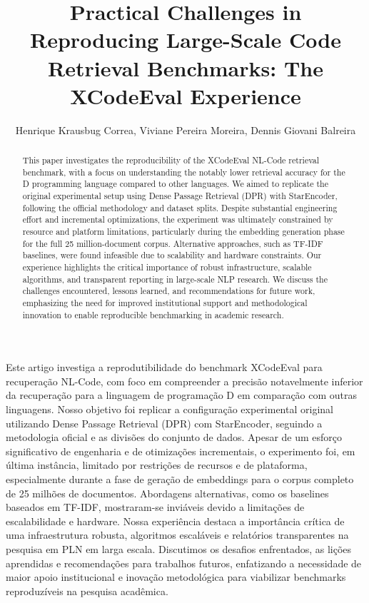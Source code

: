 \documentclass[12pt]{article}
\title{Practical Challenges in Reproducing Large-Scale Code Retrieval Benchmarks: The XCodeEval Experience}
\author{Henrique Krausbug Correa\inst{1}, Viviane Pereira Moreira\inst{1}, Dennis Giovani Balreira\inst{1}}
\begin{document}
 

\maketitle


\begin{abstract}
  This paper investigates the reproducibility of the XCodeEval NL-Code retrieval benchmark, with a focus on understanding the notably lower retrieval accuracy for the D programming language compared to other languages. We aimed to replicate the original experimental setup using Dense Passage Retrieval (DPR) with StarEncoder, following the official methodology and dataset splits. Despite substantial engineering effort and incremental optimizations, the experiment was ultimately constrained by resource and platform limitations, particularly during the embedding generation phase for the full 25 million-document corpus. Alternative approaches, such as TF-IDF baselines, were found infeasible due to scalability and hardware constraints. Our experience highlights the critical importance of robust infrastructure, scalable algorithms, and transparent reporting in large-scale NLP research. We discuss the challenges encountered, lessons learned, and recommendations for future work, emphasizing the need for improved institutional support and methodological innovation to enable reproducible benchmarking in academic research.
\end{abstract}
     
\begin{resumo} 
  Este artigo investiga a reprodutibilidade do benchmark XCodeEval para recuperação NL-Code, com foco em compreender a precisão notavelmente inferior da recuperação para a linguagem de programação D em comparação com outras linguagens. Nosso objetivo foi replicar a configuração experimental original utilizando Dense Passage Retrieval (DPR) com StarEncoder, seguindo a metodologia oficial e as divisões do conjunto de dados. Apesar de um esforço significativo de engenharia e de otimizações incrementais, o experimento foi, em última instância, limitado por restrições de recursos e de plataforma, especialmente durante a fase de geração de embeddings para o corpus completo de 25 milhões de documentos. Abordagens alternativas, como os baselines baseados em TF-IDF, mostraram-se inviáveis devido a limitações de escalabilidade e hardware. Nossa experiência destaca a importância crítica de uma infraestrutura robusta, algoritmos escaláveis e relatórios transparentes na pesquisa em PLN em larga escala. Discutimos os desafios enfrentados, as lições aprendidas e recomendações para trabalhos futuros, enfatizando a necessidade de maior apoio institucional e inovação metodológica para viabilizar benchmarks reproduzíveis na pesquisa acadêmica.
\end{resumo}
\end{document}
